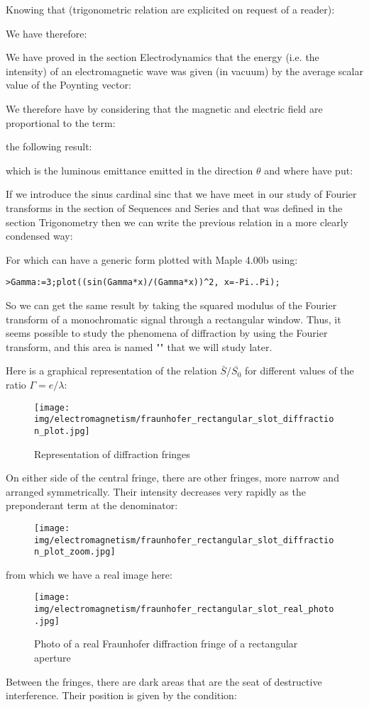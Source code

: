 	Knowing that (trigonometric relation are explicited on request of a reader):
	
	We have therefore:
	
	We have proved in the section Electrodynamics that the energy (i.e. the intensity) of an electromagnetic wave was given (in vacuum) by the average scalar value of the Poynting vector:
	
	We therefore have by considering that the magnetic and electric field are proportional to the term:
	
	the following result:
	
	which is the luminous emittance emitted in the direction $\theta$ and where have put:
	
	If we introduce the sinus cardinal sinc that we have meet in our study of Fourier transforms in the section of Sequences and Series and that was defined in the section Trigonometry then we can write the previous relation in a more clearly condensed way:
	
	For which can have a generic form plotted with Maple 4.00b using:
	
	\texttt{>Gamma:=3;plot((sin(Gamma*x)/(Gamma*x))\string^2, x=-Pi..Pi);}
	
	So we can get the same result by taking the squared modulus of the Fourier transform of a monochromatic signal through a rectangular window. Thus, it seems possible to study the phenomena of diffraction by using the Fourier transform, and this area is named "" that we will study later.
	
	Here is a graphical representation of the relation $\bar{S}/\overline{S_0}$ for different values of the ratio $\Gamma=e/\lambda$:
	\begin{figure}[H]
		\centering
		\texttt{[image: img/electromagnetism/fraunhofer\_rectangular\_slot\_diffraction\_plot.jpg]}
		\caption{Representation of diffraction fringes}
	\end{figure}
	On either side of the central fringe, there are other fringes, more narrow and arranged symmetrically. Their intensity decreases very rapidly as the preponderant  term at the denominator:
	
	\begin{figure}[H]
		\centering
		\texttt{[image: img/electromagnetism/fraunhofer\_rectangular\_slot\_diffraction\_plot\_zoom.jpg]}
	\end{figure}
	from which we have a real image here:
	\begin{figure}[H]
		\centering
		\texttt{[image: img/electromagnetism/fraunhofer\_rectangular\_slot\_real\_photo.jpg]}
		\caption{Photo of a real Fraunhofer diffraction fringe of a rectangular aperture}
	\end{figure}
	Between the fringes, there are dark areas that are the seat of destructive interference. Their position is given by the condition:
	
